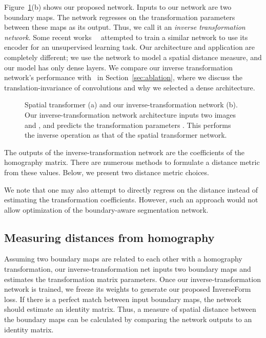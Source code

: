 \documentclass[final]{cvpr}
\begin{document}
Figure~\ref{fig:affine_transform}(b) shows our proposed network. Inputs to our network are two boundary maps. The network regresses on the transformation parameters between these maps as its output. Thus, we call it an \emph{inverse transformation network}. Some recent works~\cite{aetv2}~\cite{zhang2019aet} attempted to train a similar network to use its encoder for an unsupervised learning task. Our architecture and application are completely different; we use the network to model a spatial distance measure, and our model has only dense layers. We compare our inverse transformation network's performance with~\cite{aetv2} in Section~\ref{sec:ablation}, where we discuss the translation-invariance of convolutions and why we selected a dense architecture.

\begin{figure}[t]
\centering
{}\vspace{0.2cm}
\caption{Spatial transformer (a) and our inverse-transformation network (b). Our inverse-transformation network architecture inputs two images  and , and predicts the transformation parameters . This performs the inverse operation as that of the spatial transformer network. 
  }
  \label{fig:affine_transform}
\end{figure}

The outputs of the inverse-transformation network are the coefficients of the homography matrix. There are numerous methods to formulate a distance metric from these values. Below, we present two distance metric choices. 

We note that one may also attempt to directly regress on the distance instead of estimating the transformation coefficients. However, such an approach would not allow optimization of the boundary-aware segmentation network.   



\subsection{Measuring distances from homography}\label{sec:distancemeasures}

Assuming two boundary maps are related to each other with a homography transformation, our inverse-transformation net inputs two boundary maps and estimates the transformation matrix parameters. Once our inverse-transformation network is trained, we freeze its weights to generate our proposed InverseForm loss. If there is a perfect match between input boundary maps, the network should estimate an identity matrix. Thus, a measure of spatial distance between the boundary maps can be calculated by comparing the network outputs to an identity matrix. 
\end{document}
